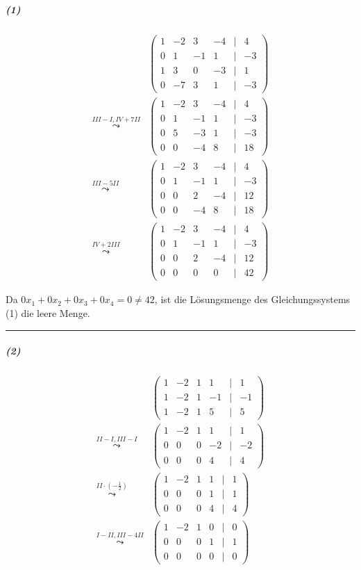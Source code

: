 \documentclass[a4paper,12pt]{article}
\begin{document}
\subparagraph{(1)}
\[
    \begin{aligned}
                                       & \begin{pmatrix}1&-2&3&-4&|&4\\0&1&-1&1&|&-3\\1&3&0&-3&|&1\\0&-7&3&1&|&-3\end{pmatrix}  \\
        \overset{III-I,IV+7II}\leadsto & \begin{pmatrix}1&-2&3&-4&|&4\\0&1&-1&1&|&-3\\0&5&-3&1&|&-3\\0&0&-4&8&|&18\end{pmatrix} \\
        \overset{III-5II}\leadsto      & \begin{pmatrix}1&-2&3&-4&|&4\\0&1&-1&1&|&-3\\0&0&2&-4&|&12\\0&0&-4&8&|&18\end{pmatrix} \\
        \overset{IV+2III}\leadsto      & \begin{pmatrix}1&-2&3&-4&|&4\\0&1&-1&1&|&-3\\0&0&2&-4&|&12\\0&0&0&0&|&42\end{pmatrix}
    \end{aligned}
\]

Da $0x_1+0x_2+0x_3+0x_4=0\not=42$, ist die Lösungsmenge des Gleichungssystems (1) die leere Menge.

\noindent\rule{\textwidth}{0.4pt}

\subparagraph{(2)}

\[
    \begin{aligned}
                                            & \begin{pmatrix}1&-2&1&1&|&1\\1&-2&1&-1&|&-1\\1&-2&1&5&|&5\end{pmatrix} \\
        \overset{II-I,III-I}\leadsto        & \begin{pmatrix}1&-2&1&1&|&1\\0&0&0&-2&|&-2\\0&0&0&4&|&4\end{pmatrix}   \\
        \overset{II\cdot(-\frac12)}\leadsto & \begin{pmatrix}1&-2&1&1&|&1\\0&0&0&1&|&1\\0&0&0&4&|&4\end{pmatrix}     \\
        \overset{I-II,III-4II}\leadsto      & \begin{pmatrix}1&-2&1&0&|&0\\0&0&0&1&|&1\\0&0&0&0&|&0\end{pmatrix}
    \end{aligned}
\]
\end{document}
